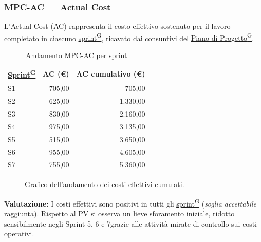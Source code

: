 \documentclass[a4paper,12pt]{article}
\providecommand{\glslink}[2]{\href{https://alittlebyte-19.github.io/Documentazione/glossario.html\#gls-#1}{\underline{#2}\textsuperscript{\scriptsize G}}}
\begin{document}
\subsubsection{MPC-AC — Actual Cost}

L'Actual Cost (AC) rappresenta il costo effettivo sostenuto per il lavoro completato in ciascuno \glslink{sprint}{sprint}, ricavato dai consuntivi del \glslink{piano-di-progetto}{Piano di Progetto}.

\begin{table}[H]
\centering
{}
\begin{tabular}{|l|r|r|}
    \hline
    \rowcolor{gray!35}
    \textbf{\glslink{sprint}{Sprint}} & \textbf{AC (\euro)} & \textbf{AC cumulativo (\euro)} \\
    \hline
    S1 & 705,00  & 705,00  \\
    S2 & 625,00  & 1.330,00 \\
    S3 & 830,00  & 2.160,00 \\
    S4 & 975,00  & 3.135,00 \\
    S5 & 515,00  & 3.650,00 \\
    S6 & 955,00  & 4.605,00 \\
    S7 & 755,00  & 5.360,00 \\
    \hline
\end{tabular}
\caption{Andamento MPC-AC per sprint}
\end{table}

\begin{figure}[H]
\centering
{}
\caption{Grafico dell'andamento dei costi effettivi cumulati.}
\end{figure}

\noindent\textbf{Valutazione:} I costi effettivi sono positivi in tutti gli \glslink{sprint}{sprint} (\emph{soglia accettabile} raggiunta). Rispetto al PV si osserva un lieve sforamento iniziale, ridotto sensibilmente negli Sprint 5, 6 e 7grazie alle attività mirate di controllo sui costi operativi.
\end{document}
